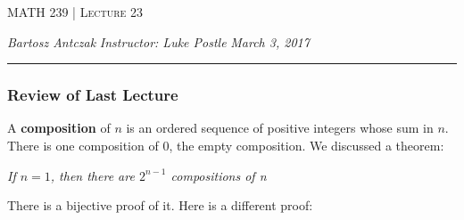 \documentclass{report}
\newcommand{\lectureNum}{23}
\newcommand{\curDate}{March 3, 2017}
\newcommand{\course}{MATH 239}
\newcommand{\instructor}{Luke Postle}
\begin{document}
\begin{center}
\begin{Large}
\textsc{\course{} | Lecture \lectureNum{}}
\end{Large}
\end{center} 
\noindent \textit{Bartosz Antczak} \hfill
\textit{Instructor: \instructor{}} \hfill
\textit{\curDate{}}
\rule{\textwidth}{0.4pt}
\subsubsection{Review of Last Lecture}
A \textbf{composition} of $n$ is an ordered sequence of positive integers whose sum in $n$. There is one composition of 0, the empty composition. We discussed a theorem:
\begin{center}
\textit{If $n=1$, then there are $2^{n-1}$ compositions of n}
\end{center}
There is a bijective proof of it.
Here is a different proof:
\end{document}
